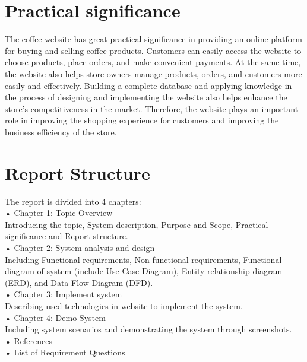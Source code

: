 \section{Practical significance} %
The coffee website has great practical significance in providing an online platform for buying and selling coffee products. Customers can easily access the website to choose products, place orders, and make convenient payments. At the same time, the website also helps store owners manage products, orders, and customers more easily and effectively. Building a complete database and applying knowledge in the process of designing and implementing the website also helps enhance the store's competitiveness in the market. Therefore, the website plays an important role in improving the shopping experience for customers and improving the business efficiency of the store.
\section{Report Structure} %
The report is divided into 4 chapters:\\
• Chapter 1: Topic Overview\\
Introducing the topic, System description, Purpose and Scope, Practical significance and Report structure.\\
• Chapter 2: System analysis and design\\
Including Functional requirements, Non-functional requirements, Functional diagram of system (include Use-Case Diagram), Entity relationship diagram (ERD), and Data Flow Diagram (DFD).\\
• Chapter 3: Implement system\\
Describing used technologies in website to implement the system. \\
• Chapter 4: Demo System \\
Including system scenarios and demonstrating the system through screenshots. \\
• References \\
• List of Requirement Questions


